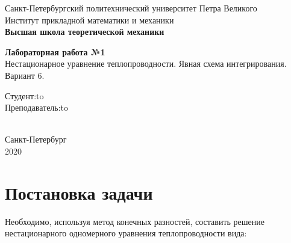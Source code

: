 \documentclass[a4paper,fontsize=14pt]{article}
\begin{document}
	
	\begin{titlepage}
		\newpage
		
		\begin{center}
			Санкт-Петербургский политехнический университет Петра Великого \\
			Институт прикладной математики и механики \\
			\textbf{Высшая школа теоретической механики}
		\end{center}
		
		\vspace{10em}
		
		\begin{center}
			\Large{\textbf{Лабораторная работа №1}} \\
			Нестационарное уравнение теплопроводности. Явная схема интегрирования. Вариант 6. \\
		\end{center}
		
		\vspace{20em}
		
		
		
		\newbox{\lbox}
		\newlength{\maxl}
		\setlength{\maxl}{\wd\lbox}
		\hfill\parbox{12cm}{
			\hspace*{5cm}\hspace*{-5cm}Студент:\hfill\hbox to\\
			\hspace*{5cm}\hspace*{-5cm}Преподаватель:\hfill\hbox to\\
			\\
		}
		
		
		\vspace{\fill}
		
		\begin{center}
			Санкт-Петербург \\2020
		\end{center}
		
	\end{titlepage}
	
	\tableofcontents
	
	\newpage
	
	\section{Постановка задачи}
	
	Необходимо, используя метод конечных разностей, составить решение нестационарного одномерного уравнения теплопроводности вида: \\
	
\end{document}
